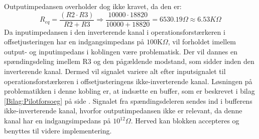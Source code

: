 Outputimpedansen overholder dog ikke kravet, da den er:
\begin{equation}
R_{eq} = \dfrac{(R2 \cdot R3)}{R2 + R3} \Longrightarrow \dfrac{10000 \cdot 18820}{10000 + 18820} = 6530.19\Omega \approx 6.53K\Omega
\end{equation}
Da inputimpedansen i den inverterende kanal i operationsforstærkeren i offsetjusteringen har en indgangsimpedans på $100$K$\Omega$, vil forholdet imellem output- og inputimpedans i koblingen være problematisk. Der vil dannes en spændingsdeling imellem R$3$ og den pågældende modstand, som sidder inden den inverterende kanal. Dermed vil signalet variere alt efter inputsignalet til operationsforstærkeren i offsetjusteringens ikke-inverterende kanal. Løsningen på problematikken i denne kobling er, at indsætte en buffer, som er beskrevet i bilag \ref{Bilag:Pilotforsoeg} på side \pageref{Bilag:Pilotforsoeg}.\cite{Schaumann2014} Signalet fra spændingsdeleren sendes ind i bufferens ikke-inverterende kanal, hvorfor outputimpedansen ikke er relevant, da denne kanal har en indgangsimpedans på $10^{12}\Omega$. Herved kan blokken accepteres og benyttes til videre implementering.